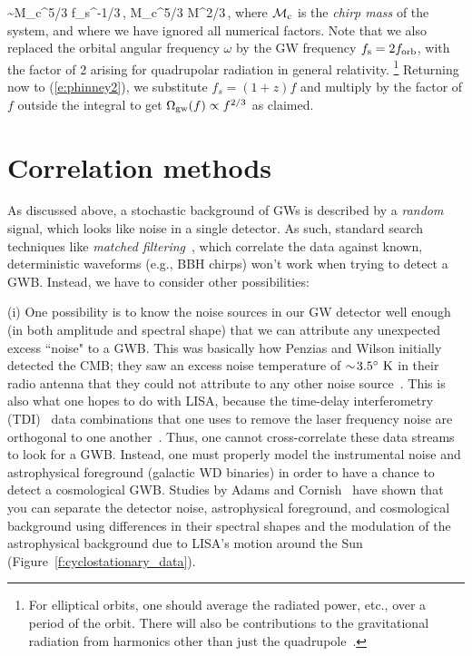 \sim {\cal M}_{\rm c}^{5/3} f_{\rm s}^{-1/3}\,,
\qquad
{\cal M}_c^{5/3} \equiv M^{2/3}\mu\,,
\ee
%
where ${\cal M}_{\rm c}$ is the {\em chirp mass} of 
the system, and where we have ignored all numerical
factors.
Note that we also replaced the orbital angular frequency
$\omega$ by the GW frequency
$f_{\rm s} = 2 f_{\rm orb}$, with the factor of 2 
arising for quadrupolar radiation in general relativity.%
\footnote{For elliptical orbits, one should average
the radiated power, etc., over a period of the orbit.
There will also be contributions to the gravitational
radiation from harmonics other than just the 
quadrupole~\cite{Peters-Mathews:1963}.} 
Returning now to (\ref{e:phinney2}), we substitute
$f_s=(1+z)f$ and multiply by the factor of $f$ outside 
the integral to get
$\Omega_{\rm gw}(f) \propto f^{2/3}$ as claimed.

\section{Correlation methods}
\label{s:correlations}

As discussed above, a stochastic background of GWs 
is described by a {\em random} signal, which looks 
like noise in a single detector.
As such, standard search techniques like 
{\em matched filtering}~\cite{Wainstein-Zubakov:1971, Helstrom:1968}, 
which correlate the data 
against known, deterministic waveforms (e.g., BBH chirps) 
won't work when trying to detect a GWB.
Instead, we have to consider other possibilities:

(i) One possibility is to know the noise sources 
in our GW detector well enough (in both 
amplitude and spectral shape) that we can 
attribute any unexpected excess ``noise" to a GWB.
This was basically how Penzias and Wilson 
initially detected the CMB; they saw an excess 
noise temperature of $\sim\!3.5^\circ~{\rm K}$ in their
radio antenna that they could not attribute to 
any other noise source~\cite{Penzias-Wilson:1965}.
This is also what one hopes to do with LISA,
because the time-delay interferometry (TDI)~\cite{Estabrook:2000ef}
data combinations that one uses to remove the laser
frequency noise are orthogonal to one another~\cite{Prince:2002hp}.
Thus, one cannot cross-correlate these data 
streams to look for a GWB.
Instead, one must properly model the instrumental 
noise and astrophysical foreground (galactic WD 
binaries) in order to have a chance to detect a
cosmological GWB.
Studies by Adams and 
Cornish~\cite{Adams-Cornish:2010, Adams-Cornish:2014}
have shown that you can separate the detector
noise, astrophysical foreground, and cosmological
background using differences in their spectral
shapes and the modulation of the astrophysical 
background due to LISA's motion around the Sun 
(Figure~\ref{f:cyclostationary_data}).


